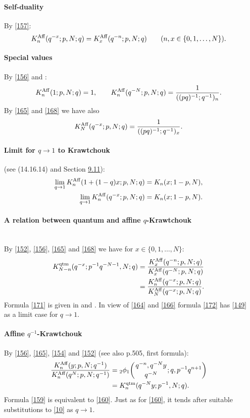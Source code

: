 \documentclass[twoside,11pt]{article}
\newcommand{\qhypK}[5]{ \mbox{}_{#1}\phi_{#2}\!\left(
  \genfrac{}{}{0pt}{}{#3}{#4};#5\right)}
\begin{document}
\paragraph{Self-duality}
By \eqref{157}:
\begin{equation}
K_n^{\rm Aff}(q^{-x};p,N;q)=K_x^{\rm Aff}(q^{-n};p,N;q)\qquad
(n,x\in\{0,1,\ldots,N\}).
\label{168}
\end{equation}
%
\paragraph{Special values}
By \eqref{156} and :
\begin{equation}
K_n^{\rm Aff}(1;p,N;q)=1,\qquad
K_n^{\rm Aff}(q^{-N};p,N;q)=\frac1{((pq)^{-1};q^{-1})_n} .
\label{165}
\end{equation}
By \eqref{165} and \eqref{168} we have also
\begin{equation}
K_N^{\rm Aff}(q^{-x};p,N;q)=\frac1{((pq)^{-1};q^{-1})_x} .
\label{170}
\end{equation}
%
\paragraph{Limit for $q\to1$ to Krawtchouk} (see (14.16.14) and Section \hyperref[sec9.11]{9.11}):
\begin{align}
\lim_{q\to1} K_n^{\rm Aff}(1+(1-q)x;p,N;q)&=K_n(x;1-p,N),
\label{162}\\
\lim_{q\to1} K_n^{\rm Aff}(q^{-x};p,N;q)&=K_n(x;1-p,N).
\label{166}
\end{align}
%
\paragraph{A relation between quantum and affine $q$-Krawtchouk}\quad\\
By \eqref{152}, \eqref{156}, \eqref{165} and \eqref{168}
we have for $x\in\{0,1,\ldots,N\}$:
\begin{align}
K_{N-n}^{\rm qtm}(q^{-x};p^{-1}q^{-N-1},N;q)
&=\frac{K_x^{\rm Aff}(q^{-n};p,N;q)}{K_x^{\rm Aff}(q^{-N};p,N;q)}
\label{171}\\
&=\frac{K_n^{\rm Aff}(q^{-x};p,N;q)}{K_N^{\rm Aff}(q^{-x};p,N;q)} .
\label{172}
\end{align}
Formula \eqref{171} is given in \cite[formula after (12)]{K24}
and \cite[(59)]{K25}.
In view of \eqref{164} and \eqref{166}
formula \eqref{172} has \eqref{149} as a limit case for
$q\to 1$.
%
\paragraph{Affine $q^{-1}$-Krawtchouk}
By \eqref{156}, \eqref{165},
\eqref{154} and \eqref{152} (see also p.505, first formula):
\begin{align}
\frac{K_n^{\rm Aff}(y;p,N;q^{-1})}{K_n^{\rm Aff}(q^N;p,N;q^{-1})}
&=\qhypK21{q^{-n},q^{-N}y}{q^{-N}}{q,p^{-1}q^{n+1}}
\label{158}\\
&=K_n^{\rm qtm}(q^{-N}y;p^{-1},N;q).
\label{159}
\end{align}
Formula \eqref{159} is equivalent to \eqref{160}.
Just as for \eqref{160}, it tends after suitable substitutions to
\eqref{10} as $q\to1$.
\end{document}
